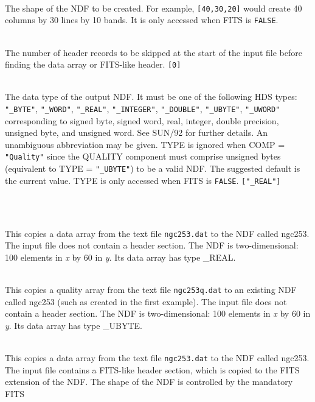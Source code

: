\documentclass[twoside,11pt]{article}
\newcommand{\htmlref}[2]{#1}
\newcommand{\xref}[3]{#1}
\newlength{\sstexampleslength}
\newcommand{\sstexamples}[1]{
   \goodbreak
   \item[Examples:] \mbox{} \\
   \vspace{-3.5ex}
   \begin{description}
      #1
   \end{description}
}
\newcommand{\sstsubsection}[1]{ \item[{#1}] \mbox{} \\}
\newcommand{\sstexamplesubsection}[2]{\sloppy
\item[\parbox{\sstexampleslength}{\ssttt #1}] \mbox{} \vspace{0.5ex}
\\ #2 \vspace{1.0ex}}
\newcommand{\sstexamples}[1]{
   \item[\vspace{0.35ex}\htmlref{Examples:\vspace{-0.5ex}}{app_example}]
      \begin{description}
         #1
      \end{description}
      \\
   }
\newcommand{\sstsubsection}[1]{\item[{#1}]}
\newcommand{\sstexamplesubsection}[2]{
   \vspace{-1.0ex} \item[{\ssttt #1}] #2 \vspace{0.2ex}}
\begin{document}
{{{      }
      \sstsubsection{
         SHAPE = \_INTEGER (Read)
      }{
         The shape of the NDF to be created.  For example, \texttt{[40,30,20]}
         would create 40 columns by 30 lines by 10 bands.  It is only
         accessed when FITS is \texttt{FALSE}.
      }
      \sstsubsection{
         SKIP = INTEGER (Read)
      }{
         The number of header records to be skipped at the start of the
         input file before finding the data array or FITS-like header.
         \texttt{[0]}
      }
      \sstsubsection{
         TYPE = LITERAL (Read)
      }{
         The data type of the output NDF.  It must be one of the
         following HDS types: \texttt{"\_BYTE"}, \texttt{"\_WORD"},
         \texttt{"\_REAL"},
         \texttt{"\_INTEGER"}, \texttt{"\_DOUBLE"}, \texttt{"\_UBYTE"},
         \texttt{"\_UWORD"} corresponding to signed byte,
         signed word, real, integer, double precision, unsigned byte,
         and unsigned word.  See \xref{SUN/92}{sun92}{} for further details.
         An unambiguous abbreviation may be given.  TYPE is ignored when
         COMP = \texttt{"Quality"} since the QUALITY component must comprise
         unsigned bytes (equivalent to TYPE = \texttt{"\_UBYTE"}) to be a valid
         NDF. The suggested default is the current value.  TYPE is only
         accessed when FITS is \texttt{FALSE}.  \texttt{["\_REAL"]}
       }
   }
   \sstexamples{
      \sstexamplesubsection{
         ascii2ndf ngc253.dat ngc253 shape=[100,60]
      }{
         This copies a data array from the text file \texttt{ngc253.dat} to the
         NDF called ngc253.  The input file does not contain a header
         section.  The NDF is two-dimensional: 100 elements in \textit{x} by 60
         in \textit{y}.  Its data array has type \_REAL.
      }
      \sstexamplesubsection{
         ascii2ndf ngc253q.dat ngc253 q shape=[100,60]
      }{
         This copies a quality array from the text file \texttt{ngc253q.dat} to
         an existing NDF called ngc253 (such as created in the first
         example).  The input file does not contain a header section.  The NDF
         is two-dimensional: 100 elements in \textit{x} by 60 in \textit{y}.  
         Its data array has type \_UBYTE.
      }
      \sstexamplesubsection{
         ascii2ndf ngc253.dat ngc253 fits
      }{
         This copies a data array from the text file \texttt{ngc253.dat}
         to the NDF called ngc253.  The input file contains a FITS-like
         header section, which is copied to the FITS extension of the
         NDF.  The shape of the NDF is controlled by the mandatory FITS
}}}
\end{document}
